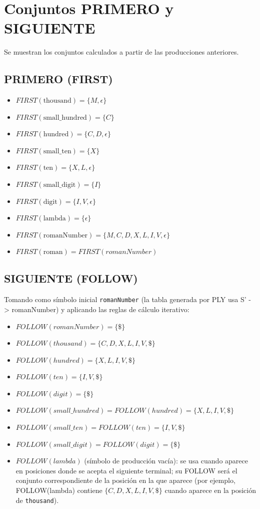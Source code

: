 \documentclass[a4paper,11pt]{article}
\begin{document}
\section{Conjuntos PRIMERO y SIGUIENTE}
Se muestran los conjuntos calculados a partir de las producciones anteriores.

\subsection*{PRIMERO (FIRST)}
\begin{itemize}
\item $FIRST(\text{thousand}) = \{M, \epsilon\}$
\item $FIRST(\text{small\_hundred}) = \{C\}$
\item $FIRST(\text{hundred}) = \{C, D, \epsilon\}$
\item $FIRST(\text{small\_ten}) = \{X\}$
\item $FIRST(\text{ten}) = \{X, L, \epsilon\}$
\item $FIRST(\text{small\_digit}) = \{I\}$
\item $FIRST(\text{digit}) = \{I, V, \epsilon\}$
\item $FIRST(\text{lambda}) = \{\epsilon\}$
\item $FIRST(\text{romanNumber}) = \{M, C, D, X, L, I, V, \epsilon\}$
\item $FIRST(\text{roman}) = FIRST(romanNumber)$
\end{itemize}

\subsection*{SIGUIENTE (FOLLOW)}
Tomando como símbolo inicial \texttt{romanNumber} (la tabla generada por PLY usa S' -> romanNumber) y aplicando las reglas de cálculo
iterativo:
\begin{itemize}
\item $FOLLOW(romanNumber) = \{\$\}$
\item $FOLLOW(thousand) = \{C, D, X, L, I, V, \$\}$
\item $FOLLOW(hundred) = \{X, L, I, V, \$\}$
\item $FOLLOW(ten) = \{I, V, \$\}$
\item $FOLLOW(digit) = \{\$\}$
\item $FOLLOW(small\_hundred) = FOLLOW(hundred) = \{X, L, I, V, \$\}$
\item $FOLLOW(small\_ten) = FOLLOW(ten) = \{I, V, \$\}$
\item $FOLLOW(small\_digit) = FOLLOW(digit) = \{\$\}$
\item $FOLLOW(lambda)$ (símbolo de producción vacía): se usa cuando aparece en posiciones donde se acepta el siguiente terminal; su FOLLOW será el conjunto correspondiente de la posición en la que aparece (por ejemplo, FOLLOW(lambda) contiene $\{C,D,X,L,I,V,\$\}$ cuando aparece en la posición de \texttt{thousand}).
\end{itemize}
\end{document}
